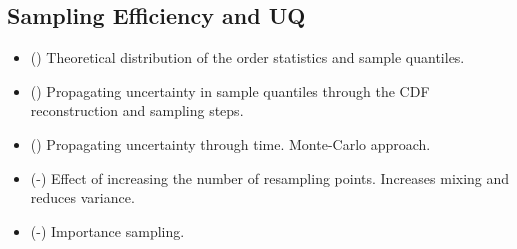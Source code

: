 \subsection{Sampling Efficiency and UQ}


\begin{itemize}
    \item (\checkmark) Theoretical distribution of the order statistics and sample quantiles.
    \item (\cdot) Propagating uncertainty in sample quantiles through the CDF reconstruction and sampling steps.
    \item (\cdot) Propagating uncertainty through time.  Monte-Carlo approach.
    \item (\checkmark-) Effect of increasing the number of resampling points.  Increases mixing and reduces variance.
    \item (\checkmark-) Importance sampling.
\end{itemize}
